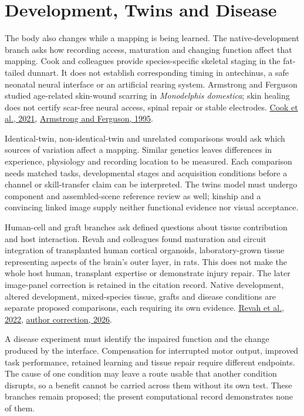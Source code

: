 \section{Development, Twins and Disease}

The body also changes while a mapping is being learned. The native-development branch asks how recording access, maturation and changing function affect that mapping. Cook and colleagues provide species-specific skeletal staging in the fat-tailed dunnart. It does not establish corresponding timing in antechinus, a safe neonatal neural interface or an artificial rearing system. Armstrong and Ferguson studied age-related skin-wound scarring in \emph{Monodelphis domestica}; skin healing does not certify scar-free neural access, spinal repair or stable electrodes. \href{https://www.nature.com/articles/s42003-021-02506-2}{Cook et al., 2021}, \href{https://pubmed.ncbi.nlm.nih.gov/7750642/}{Armstrong and Ferguson, 1995}.\par

Identical-twin, non-identical-twin and unrelated comparisons would ask which sources of variation affect a mapping. Similar genetics leaves differences in experience, physiology and recording location to be measured. Each comparison needs matched tasks, developmental stages and acquisition conditions before a channel or skill-transfer claim can be interpreted. The twins model must undergo component and assembled-scene reference review as well; kinship and a convincing linked image supply neither functional evidence nor visual acceptance.\par

Human-cell and graft branches ask defined questions about tissue contribution and host interaction. Revah and colleagues found maturation and circuit integration of transplanted human cortical organoids, laboratory-grown tissue representing aspects of the brain's outer layer, in rats. This does not make the whole host human, transplant expertise or demonstrate injury repair. The later image-panel correction is retained in the citation record. Native development, altered development, mixed-species tissue, grafts and disease conditions are separate proposed comparisons, each requiring its own evidence. \href{https://www.nature.com/articles/s41586-022-05277-w}{Revah et al., 2022}, \href{https://www.nature.com/articles/s41586-026-10943-4}{author correction, 2026}.\par

A disease experiment must identify the impaired function and the change produced by the interface. Compensation for interrupted motor output, improved task performance, retained learning and tissue repair require different endpoints. The cause of one condition may leave a route usable that another condition disrupts, so a benefit cannot be carried across them without its own test. These branches remain proposed; the present computational record demonstrates none of them.\par

